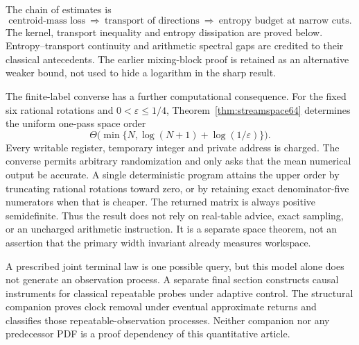 The chain of estimates is
\[
 \text{centroid-mass loss}\ \Longrightarrow\
 \text{transport of directions}\ \Longrightarrow\
 \text{entropy budget at narrow cuts}.
\]
The kernel, transport inequality and entropy dissipation are proved
below. Entropy--transport continuity and arithmetic spectral gaps are
credited to their classical antecedents. The earlier mixing-block proof
is retained as an alternative weaker bound, not used to hide a
logarithm in the sharp result.

The finite-label converse has a further computational consequence.
For the fixed six rational rotations and $0<\varepsilon\le1/4$,
Theorem~\ref{thm:streamspace64}
determines the uniform one-pass space order
\[
 \Theta\bigl(\min\{N,\log(N+1)+\log(1/\varepsilon)\}\bigr).
\]
Every writable register, temporary integer and private address is charged.
The converse permits arbitrary randomization and only asks that the mean
numerical output be accurate. A single deterministic program attains
the upper order by truncating rational rotations toward zero, or by
retaining exact denominator-five numerators when that is cheaper.
The returned matrix is always positive semidefinite. Thus the result
does not rely on real-table advice, exact sampling, or an uncharged
arithmetic instruction. It is a separate space theorem, not an assertion
that the primary width invariant already measures workspace.

A prescribed joint terminal law is one possible query, but this model
alone does not generate an observation process. A separate final section
constructs causal instruments for classical repeatable probes under
adaptive control. The structural companion proves clock removal under
eventual approximate returns and classifies those repeatable-observation
processes. Neither companion nor any predecessor PDF is a proof
dependency of this quantitative article.
